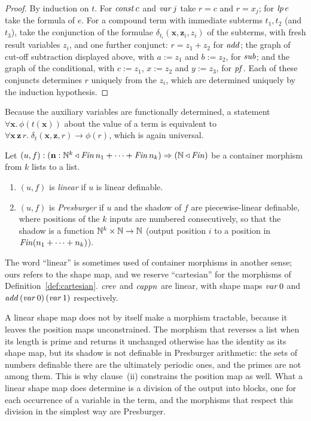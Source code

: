 \documentclass{fundam}
\begin{document}
\begin{proof}
  By induction on $t$.  For $\mathit{const}\,c$ and $\mathit{var}\,j$ take $r = c$ and $r = x_j$;
  for $\mathit{lp}\,e$ take the formula of $e$.
  For a compound term with immediate subterms $t_1, t_2$ (and $t_3$), take the conjunction
  of the formulae $\delta_{t_i}(\mathbf{x}, \mathbf{z}_i, z_i)$ of the subterms, with
  fresh result variables $z_i$, and one further conjunct: $r = z_1 + z_2$ for
  $\mathit{add}$; the graph of cut-off subtraction displayed above, with $a := z_1$ and
  $b := z_2$, for $\mathit{sub}$; and the graph of the conditional, with $c := z_1$,
  $x := z_2$ and $y := z_3$, for $\mathit{pf}$.  Each of these conjuncts determines $r$
  uniquely from the $z_i$, which are determined uniquely by the induction hypothesis.
\end{proof}

Because the auxiliary variables are functionally determined, a statement
$\forall \mathbf{x}.\, \phi(t(\mathbf{x}))$ about the value of a term is equivalent to
$\forall \mathbf{x}\,\mathbf{z}\,r.\; \delta_t(\mathbf{x},\mathbf{z},r) \to \phi(r)$,
which is again universal.

\begin{definition}\label{def:pmor}
  Let $(u, f) : (\mathbf{n} : \mathbb{N}^k \triangleleft \mathit{Fin}\,n_1 + \dots + \mathit{Fin}\,n_k) \Rightarrow (\mathbb{N} \triangleleft \mathit{Fin})$
  be a container morphism from $k$ lists to a list.
  \begin{enumerate}[label=(\roman*),leftmargin=2em]
  \item $(u, f)$ is \emph{linear} if $u$ is linear definable.
  \item $(u, f)$ is \emph{Presburger} if $u$ and the shadow of $f$ are piecewise-linear
    definable, where positions of the $k$ inputs are numbered consecutively, so that the
    shadow is a function $\mathbb{N}^k \times \mathbb{N} \to \mathbb{N}$ (output position $i$ to a position in
    $\mathit{Fin}(n_1 + \dots + n_k)$).
  \end{enumerate}
\end{definition}

The word ``linear'' is sometimes used of container morphisms in another sense; ours
refers to the shape map, and we reserve ``cartesian'' for the morphisms of
Definition~\ref{def:cartesian}.  $\mathit{crev}$ and
$\mathit{cappn}$ are linear, with shape maps $\mathit{var}\,0$ and
$\mathit{add}\,(\mathit{var}\,0)\,(\mathit{var}\,1)$ respectively.

A linear shape map does not by itself make a morphism tractable, because it leaves the
position maps unconstrained.  The morphism that reverses a list when its length is prime
and returns it unchanged otherwise has the identity as its shape map, but its shadow is
not definable in Presburger arithmetic: the sets of numbers definable there are the
ultimately periodic ones, and the primes are not among them.  This is why clause~(ii)
constrains the position map as well.  What a linear shape map does determine is a division
of the output into blocks, one for each occurrence of a variable in the term, and the
morphisms that respect this division in the simplest way are Presburger.
\end{document}
